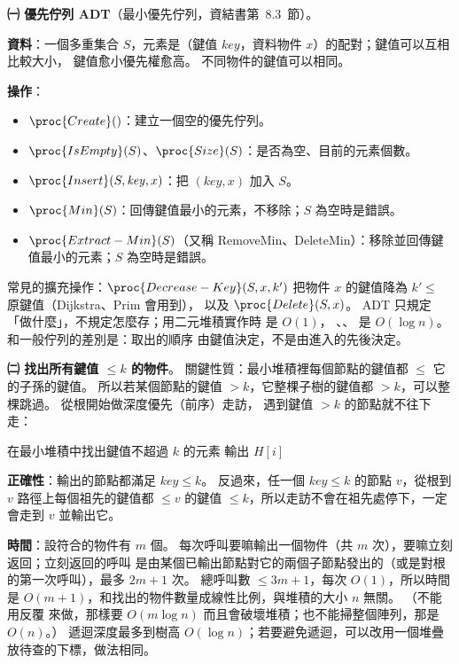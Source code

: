 \begin{pastsoln}
\textbf{㈠ 優先佇列 ADT}（最小優先佇列，資結書第~8.3~節）。

\textbf{資料}：一個多重集合 $S$，元素是（鍵值 $\mathit{key}$，資料物件 $x$）的配對；鍵值可以互相比較大小，
鍵值愈小優先權愈高。 不同物件的鍵值可以相同。

\textbf{操作}：
\begin{itemize}
\item $\proc{Create}()$：建立一個空的優先佇列。
\item $\proc{IsEmpty}(S)$、$\proc{Size}(S)$：是否為空、目前的元素個數。
\item $\proc{Insert}(S, \mathit{key}, x)$：把 $(\mathit{key}, x)$ 加入 $S$。
\item $\proc{Min}(S)$：回傳鍵值最小的元素，不移除；$S$ 為空時是錯誤。
\item $\proc{Extract-Min}(S)$（又稱 RemoveMin、DeleteMin）：移除並回傳鍵值最小的元素；$S$ 為空時是錯誤。
\end{itemize}
常見的擴充操作：$\proc{Decrease-Key}(S, x, k')$ 把物件 $x$ 的鍵值降為 $k' \le$ 原鍵值（Dijkstra、Prim 會用到），
以及 $\proc{Delete}(S, x)$。 ADT 只規定「做什麼」，不規定怎麼存；用二元堆積實作時  是 $O(1)$，
、、 是 $O(\log n)$。 和一般佇列的差別是：取出的順序
由鍵值決定，不是由進入的先後決定。

\textbf{㈡ 找出所有鍵值 $\le k$ 的物件}。 關鍵性質：最小堆積裡每個節點的鍵值都 $\le$ 它的子孫的鍵值。
所以若某個節點的鍵值 $> k$，它整棵子樹的鍵值都 $> k$，可以整棵跳過。 從根開始做深度優先（前序）走訪，
遇到鍵值 $> k$ 的節點就不往下走：
\begin{pseudo}{在最小堆積中找出鍵值不超過 $k$ 的元素}
 
        \State \Return {}
    \EndIf
    \State 輸出 $H[i]$
    \State {} 
    \State {} 
\EndProcedure
\end{pseudo}
\textbf{正確性}：輸出的節點都滿足 $\mathit{key} \le k$。 反過來，任一個 $\mathit{key} \le k$ 的節點 $v$，從根到
$v$ 路徑上每個祖先的鍵值都 $\le v$ 的鍵值 $\le k$，所以走訪不會在祖先處停下，一定會走到 $v$ 並輸出它。

\textbf{時間}：設符合的物件有 $m$ 個。 每次呼叫要嘛輸出一個物件（共 $m$ 次），要嘛立刻返回；立刻返回的呼叫
是由某個已輸出節點對它的兩個子節點發出的（或是對根的第一次呼叫），最多 $2m + 1$ 次。 總呼叫數
$\le 3m + 1$，每次 $O(1)$，所以時間是 $O(m + 1)$，和找出的物件數量成線性比例，與堆積的大小 $n$ 無關。
（不能用反覆  來做，那樣要 $O(m \log n)$ 而且會破壞堆積；也不能掃整個陣列，那是 $O(n)$。）
遞迴深度最多到樹高 $O(\log n)$；若要避免遞迴，可以改用一個堆疊放待查的下標，做法相同。
\end{pastsoln}
